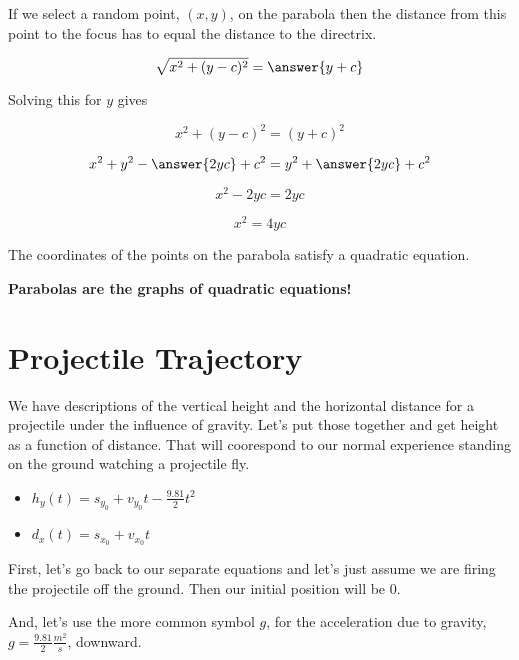 \documentclass{ximera}
\begin{document}
\begin{idea}
If we select a random point, $(x,y)$, on the parabola then the distance from this point to the focus has to equal the distance to the directrix.


\[  \sqrt{x^2 + (y-c)^2} = \answer{y+c}   \]


Solving this for $y$ gives


\[  x^2 + (y-c)^2 = (y+c)^2   \]

\[  x^2 + y^2 - \answer{2 y c} + c^2 = y^2 + \answer{2 y c} + c^2   \]

\[  x^2  - 2 y c  =  2 y c    \]

\[  x^2   =  4 y c    \]


The coordinates of the points on the parabola satisfy a quadratic equation.  


\begin{center}
\textbf{\textcolor{red!80!black}{Parabolas are the graphs of quadratic equations!}}
\end{center}


\end{idea}








\section{Projectile Trajectory}


We have descriptions of the vertical height and the horizontal distance for a projectile under the influence of gravity.  Let's put those together and get height as a function of distance.  That will coorespond to our normal experience standing on the ground watching a projectile fly.


\begin{itemize}
\item $h_y(t) = s_{y_0} + v_{y_0} t - \frac{9.81}{2} t^2$


\item $d_x(t) = s_{x_0} + v_{x_0} t$
\end{itemize}




First, let's go back to our separate equations and let's just assume we are firing the projectile off the ground.  Then our initial position will be $0$.  

And, let's use the more common symbol $g$, for the acceleration due to gravity, $g = \frac{9.81}{2} \frac{m^2}{s}$, downward.
\end{document}
